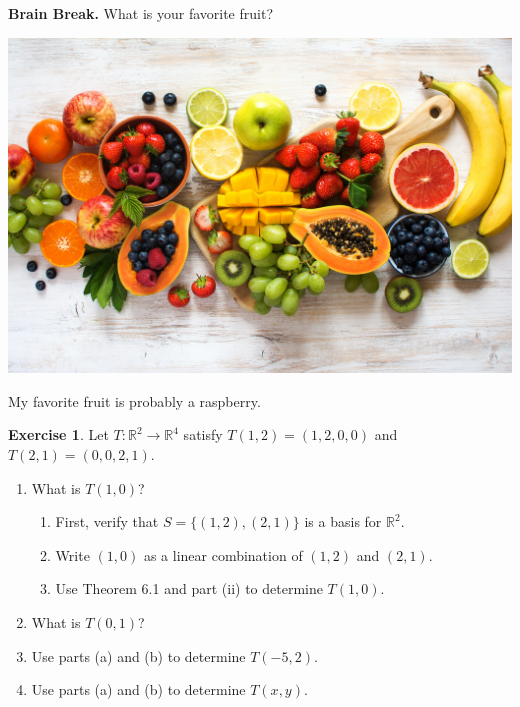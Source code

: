 \documentclass{beamer}
\newcommand{\R}{\mathbb{R}}
\newcommand{\fn}{\insertframenumber}
\theoremstyle{definition}
\newtheorem{exercise}{Exercise}
\begin{document}
\begin{frame}{\fn}
	\begin{block}{\textbf{Brain Break.}}
		What is your favorite fruit?
		\begin{center}
			\includegraphics[height=.3\textheight]{../images/fruit}
		\end{center}
	
		My favorite fruit is probably a raspberry.
	\end{block}
\end{frame}
\begin{frame}{\fn}
	\begin{exercise}
		Let $T:\R^2\to \R^4$ satisfy $T(1,2)=(1,2,0,0)$ and $T(2,1)=(0,0,2,1)$. 
		\begin{enumerate}[label=(\alph*)]
			\item  What is $T(1,0)$?
		\begin{enumerate}[label=\roman*.]
			\item First, verify that $S=\{(1,2),(2,1)\}$ is a basis for $\R^2$.
			\item Write $(1,0)$ as a linear combination of $(1,2)$ and $(2,1)$.
			\item Use Theorem 6.1 and part (ii) to determine $T(1,0)$.
		\end{enumerate}
			\item What is $T(0,1)$?
			\item Use parts (a) and (b) to determine $T(-5,2)$.
			\item Use parts (a) and (b) to determine $T(x,y)$.
		\end{enumerate}
	\end{exercise}
\end{frame}
\end{document}
